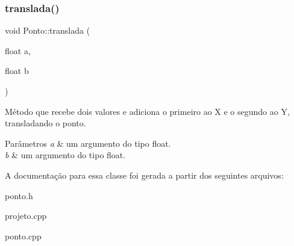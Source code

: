 \subsubsection{\texorpdfstring{translada()}{translada()}}
{\footnotesize\ttfamily void Ponto\+::translada (\begin{DoxyParamCaption}\item[{float}]{a,  }\item[{float}]{b }\end{DoxyParamCaption})\hspace{0.3cm}{\ttfamily [inline]}}



Método que recebe dois valores e adiciona o primeiro ao X e o segundo ao Y, transladando o ponto. 


\begin{DoxyParams}{Parâmetros}
{\em a} & um argumento do tipo float. \\
\hline
{\em b} & um argumento do tipo float. \\
\hline
\end{DoxyParams}


A documentação para essa classe foi gerada a partir dos seguintes arquivos\+:\begin{DoxyCompactItemize}
\item 
ponto.\+h\item 
projeto.\+cpp\item 
ponto.\+cpp\end{DoxyCompactItemize}
